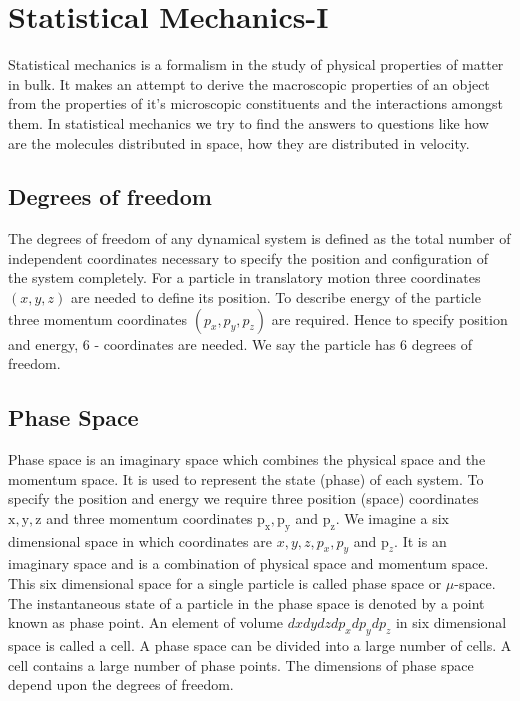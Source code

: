 \chapter{Statistical Mechanics-I}
Statistical mechanics is a formalism in the study of physical properties of matter in bulk. It makes an attempt to derive the macroscopic properties of an object from the properties of it's microscopic constituents and the interactions amongst them. In statistical mechanics we try to find the answers to questions like how are the molecules distributed in space, how they are distributed in velocity.
\section{Degrees of freedom}
The degrees of freedom of any dynamical system is defined as the total number of independent coordinates necessary to specify the position and configuration of the system completely.
For a particle in translatory motion three coordinates $(x, y, z)$ are needed to define its position. To describe energy of the particle three momentum coordinates $\left(p_{x}, p_{y}, p_{z}\right)$ are required. Hence to specify position and energy, 6 - coordinates are needed. We say the particle has 6 degrees of freedom.
\section{Phase Space}
Phase space is an imaginary space which combines the physical space and the momentum space. It is used to represent the state (phase) of each system.
To specify the position and energy we require three position (space) coordinates $\mathrm{x}, \mathrm{y}, \mathrm{z}$ and three momentum coordinates $\mathrm{p}_{\mathrm{x}}, \mathrm{p}_{\mathrm{y}}$ and $\mathrm{p}_{\mathrm{z}}$. We imagine a six dimensional space in which coordinates are $x, y, z, p_{x}, p_{y}$ and $\mathrm{p}_{z}$. It is an imaginary space and is a combination of physical space and momentum space. This six dimensional space for a single particle is called phase space or $\mu$-space. The instantaneous state of a particle in the phase space is denoted by a point known as phase point. An element of volume $d x d y d z d p_{x} d p_{y} d p_{z}$ in six dimensional space is called a cell. A phase space can be divided into a large number of cells. A cell contains a large number of phase points. The dimensions of phase space depend upon the degrees of freedom.
